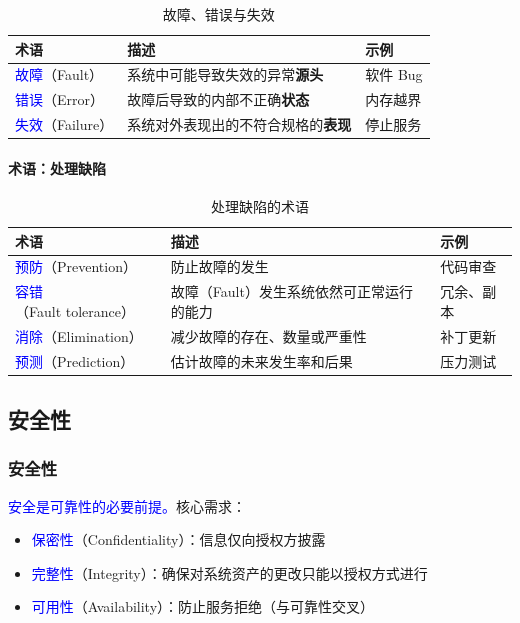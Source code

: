 \documentclass[UTF8,a4paper,11pt]{ctexart}
\newcommand{\blue}[1]{\textcolor{blue}{#1}}
\begin{document}
\begin{table}[H]
\centering
\caption{故障、错误与失效}
\begin{tabularx}{\textwidth}{>{\raggedright\arraybackslash}p{}X>{\raggedright\arraybackslash}p{}}
\toprule
\textbf{术语} & \textbf{描述} & \textbf{示例} \\
\midrule
\blue{故障}（Fault） & 系统中可能导致失效的异常\textbf{源头} & 软件 Bug \\
\blue{错误}（Error） & 故障后导致的内部不正确\textbf{状态} & 内存越界 \\
\blue{失效}（Failure） & 系统对外表现出的不符合规格的\textbf{表现} & 停止服务 \\
\bottomrule
\end{tabularx}
\end{table}

\paragraph{术语：处理缺陷}
\begin{table}[H]
\centering
\caption{处理缺陷的术语}
\begin{tabularx}{\textwidth}{>{\raggedright\arraybackslash}p{}X>{\raggedright\arraybackslash}p{}}
\toprule
\textbf{术语} & \textbf{描述} & \textbf{示例} \\
\midrule
\blue{预防}（Prevention） & 防止故障的发生 & 代码审查 \\
\blue{容错}（Fault tolerance） & 故障（Fault）发生系统依然可正常运行的能力 & 冗余、副本 \\
\blue{消除}（Elimination） & 减少故障的存在、数量或严重性 & 补丁更新 \\
\blue{预测}（Prediction） & 估计故障的未来发生率和后果 & 压力测试 \\
\bottomrule
\end{tabularx}
\end{table}

\subsection{安全性}

\subsubsection*{安全性}

\blue{安全是可靠性的必要前提。}核心需求：
\begin{itemize}
  \item \blue{保密性}（Confidentiality）：信息仅向授权方披露
  \item \blue{完整性}（Integrity）：确保对系统资产的更改只能以授权方式进行
  \item \blue{可用性}（Availability）：防止服务拒绝（与可靠性交叉）
\end{itemize}
\end{document}
